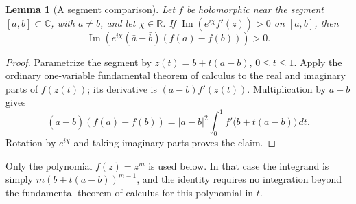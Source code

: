 \documentclass[11pt,a4paper]{article}
\newtheorem{lemma}[theorem]{Lemma}
\theoremstyle{definition}
\theoremstyle{remark}
\numberwithin{equation}{section}
\begin{document}
\begin{lemma}[A segment comparison]
\label{thm:sector-difference}
Let $f$ be holomorphic near the segment $[a,b]\subset\mathbb C$, with $a\ne b$,
and let $\chi\in\mathbb R$.  If
$\operatorname{Im}(e^{i\chi}f'(z))>0$ on $[a,b]$, then
\[
 \operatorname{Im}\!\left(e^{i\chi}
          (\bar a-\bar b)(f(a)-f(b))\right)>0.
\]
\end{lemma}
\begin{proof}
Parametrize the segment by $z(t)=b+t(a-b)$, $0\le t\le1$.
Apply the ordinary one-variable fundamental theorem of calculus to the
real and imaginary parts of $f(z(t))$; its derivative is
$(a-b)f'(z(t))$. Multiplication by $\bar a-\bar b$ gives
\begin{equation}\label{eq:sector-difference}
 (\bar a-\bar b)(f(a)-f(b))
 =|a-b|^2\int_0^1 f'\bigl(b+t(a-b)\bigr)\,dt.
\end{equation}
Rotation by $e^{i\chi}$ and taking imaginary parts proves the claim.
\end{proof}
Only the polynomial $f(z)=z^m$ is used below. In that case the integrand
is simply $m(b+t(a-b))^{m-1}$, and the identity requires no integration
beyond the fundamental theorem of calculus for this polynomial in $t$.
\end{document}
